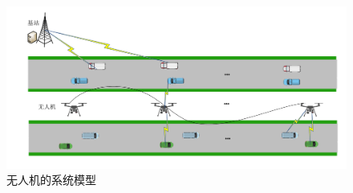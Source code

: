\begin{figure}[H]
\centering
\includegraphics[width=12cm]{..//figures//chap4//第四章系统模型图.pdf}
\caption{无人机的系统模型}
\label{systemuav2}
\end{figure}

